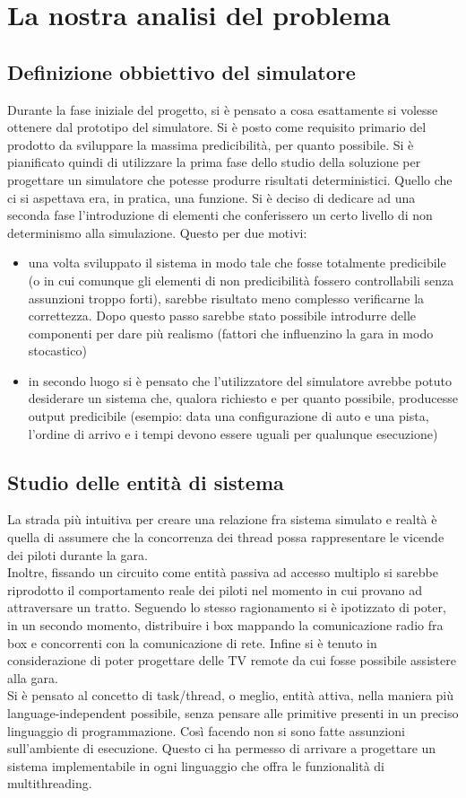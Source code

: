 \section{La nostra analisi del problema}
\subsection{Definizione obbiettivo del simulatore}
Durante la fase iniziale del progetto, si è pensato a cosa esattamente si volesse ottenere dal prototipo del simulatore. Si è posto come requisito primario del prodotto da sviluppare la massima predicibilità, per quanto possibile. Si è pianificato quindi di utilizzare la prima fase dello studio della soluzione per progettare un simulatore che potesse produrre risultati deterministici. Quello che ci si aspettava era, in pratica, una funzione. Si è deciso di dedicare ad una seconda fase l'introduzione di elementi che conferissero un certo livello di non determinismo alla simulazione. Questo per due motivi:
\begin{itemize}
               \item una volta sviluppato il sistema in modo tale che fosse totalmente predicibile (o in cui comunque gli elementi di non predicibilità fossero controllabili senza assunzioni troppo forti), sarebbe risultato meno complesso verificarne la correttezza. Dopo questo passo sarebbe stato possibile introdurre delle componenti per dare più realismo (fattori che influenzino la gara in modo stocastico)
                \item in secondo luogo si è pensato che l’utilizzatore del simulatore avrebbe potuto desiderare un sistema che, qualora richiesto e per quanto possibile, producesse output predicibile (esempio: data una configurazione di auto e una pista, l’ordine di arrivo e i tempi devono essere uguali per qualunque esecuzione)
\end{itemize}
\subsection{Studio delle entità di sistema}
La strada più intuitiva per creare una relazione fra sistema simulato e realtà è quella di assumere che la concorrenza dei thread possa rappresentare le vicende dei piloti durante la gara.\\
Inoltre, fissando un circuito come entità passiva ad accesso multiplo si sarebbe riprodotto il comportamento reale dei piloti nel momento in cui provano ad attraversare un tratto.
Seguendo lo stesso ragionamento si è ipotizzato di poter, in un secondo momento, distribuire i box mappando la comunicazione radio fra box e concorrenti con la comunicazione di rete. Infine si è tenuto in considerazione di poter progettare delle TV remote da cui fosse possibile assistere alla gara.\\
Si è pensato al concetto di task/thread, o meglio, entità attiva, nella maniera più language-independent possibile, senza pensare alle primitive presenti in un preciso linguaggio di programmazione. Così facendo non si sono fatte assunzioni sull'ambiente di esecuzione. Questo ci ha permesso di arrivare a progettare un sistema implementabile in ogni linguaggio che offra le funzionalità di multithreading.
